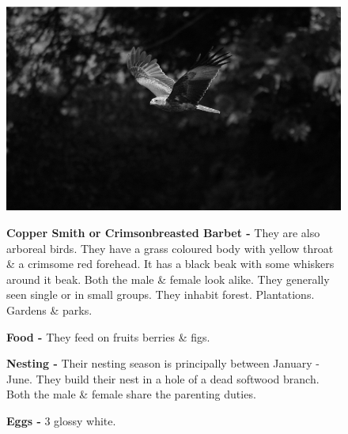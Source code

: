 \begin{figure}[H]
\begin{center}
\includegraphics{figure/Land_birds/01_pariah_kite/pariah-kite.eps}
\end{center}
\medskip
\noindent
{\bf Copper Smith or Crimsonbreasted Barbet -} They are also arboreal birds. They have a grass coloured body with yellow throat \& a crimsome red forehead. It has a black beak with some whiskers around it beak. Both the male \& female look alike. They generally seen single or in small groups. They inhabit forest. Plantations. Gardens \& parks.

\medskip
{\bf Food -} They feed on fruits berries \& figs.

{\bf Nesting -} Their nesting season is principally between January - June. They build their nest in a hole of a dead softwood branch. Both the male \& female share the parenting duties.

{\bf Eggs -} 3 glossy white.
\end{figure}

\vfill\eject

~\phantom{a}
\vfill

